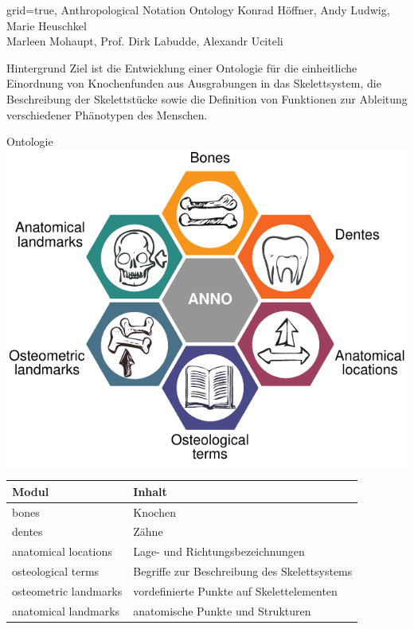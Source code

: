 \documentclass[portrait,final,a0paper,fontscale=0.320]{imiseposter}
\begin{document}
\begin{poster}%
  {grid=true,}
  {}
  {Anthropological Notation Ontology}
  {Konrad Höffner, Andy Ludwig, Marie Heuschkel\\Marleen Mohaupt, Prof. Dirk Labudde, Alexandr Uciteli}
  {%
  }

\begin{posterbox}[name=background,column=0,row=0]{Hintergrund}
Ziel ist die Entwicklung einer Ontologie für die einheitliche Einordnung von Knochenfunden aus Ausgrabungen in das Skelettsystem, die Beschreibung der Skelettstücke sowie die Definition von Funktionen zur Ableitung verschiedener Phänotypen des Menschen. 
\end{posterbox}
\begin{posterbox}[name=ontology,below=background]{Ontologie}
\includegraphics[width=\textwidth]{img/anno.pdf}
\begin{tabular}{ll}
\toprule
\textbf{Modul}			&\textbf{Inhalt}\\
\midrule
bones					&Knochen\\
dentes					&Zähne\\
anatomical locations	&Lage- und Richtungsbezeichnungen\\
osteological terms		&Begriffe zur Beschreibung des Skelettsystems\\
osteometric landmarks	&vordefinierte Punkte auf Skelettelementen\\
anatomical landmarks	&anatomische Punkte und Strukturen\\
\bottomrule
\end{tabular}


\end{posterbox}
\end{poster}
\end{document}
